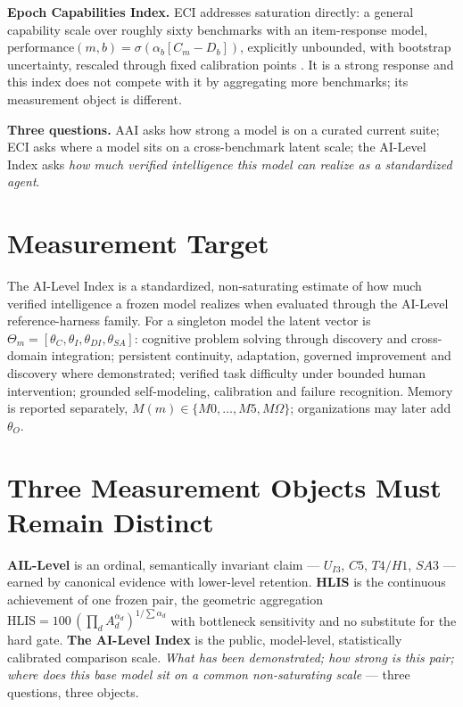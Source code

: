 \documentclass[11pt]{article}
\theoremstyle{definition}
\begin{document}
\textbf{Epoch Capabilities Index.} ECI addresses saturation directly: a general capability scale over roughly sixty benchmarks with an item-response model, $\text{performance}(m, b) = \sigma(\alpha_b[C_m - D_b])$, explicitly unbounded, with bootstrap uncertainty, rescaled through fixed calibration points \citep{epoch2026eci}. It is a strong response and this index does not compete with it by aggregating more benchmarks; its measurement object is different.

\textbf{Three questions.} AAI asks how strong a model is on a curated current suite; ECI asks where a model sits on a cross-benchmark latent scale; the AI-Level Index asks \emph{how much verified intelligence this model can realize as a standardized agent}.

\section{Measurement Target}\label{sec:target}

The AI-Level Index is a standardized, non-saturating estimate of how much verified intelligence a frozen model realizes when evaluated through the AI-Level reference-harness family. For a singleton model the latent vector is $\Theta_m = [\theta_C, \theta_I, \theta_{DI}, \theta_{SA}]$: cognitive problem solving through discovery and cross-domain integration; persistent continuity, adaptation, governed improvement and discovery where demonstrated; verified task difficulty under bounded human intervention; grounded self-modeling, calibration and failure recognition. Memory is reported separately, $M(m) \in \{M0, \ldots, M5, M\Omega\}$; organizations may later add $\theta_O$.

\section{Three Measurement Objects Must Remain Distinct}\label{sec:three}

\textbf{AIL-Level} is an ordinal, semantically invariant claim --- $U_{I3}$, $C5$, $T4/H1$, $SA3$ --- earned by canonical evidence with lower-level retention. \textbf{HLIS} is the continuous achievement of one frozen pair, the geometric aggregation $\text{HLIS} = 100\,(\prod_d A_d^{\alpha_d})^{1/\sum\alpha_d}$ with bottleneck sensitivity and no substitute for the hard gate. \textbf{The AI-Level Index} is the public, model-level, statistically calibrated comparison scale. \emph{What has been demonstrated; how strong is this pair; where does this base model sit on a common non-saturating scale} --- three questions, three objects.
\end{document}
